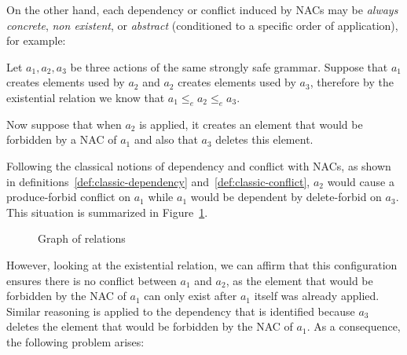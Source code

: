 On the other hand, each dependency or conflict induced by NACs may be \emph{always concrete}, \emph{non existent}, or \emph{abstract} (conditioned to a specific order of application), for example: 

Let $a_1, a_2, a_3$ be three actions of the same strongly safe grammar. Suppose that $a_1$ creates elements used by $a_2$ and $a_2$ creates elements used by $a_3$, therefore by the existential relation we know that $a_1 \leq_e a_2 \leq_e a_3$.

Now suppose that when $a_2$ is applied, it creates an element that would be forbidden by a NAC of $a_1$ and also that $a_3$ deletes this element. 

Following the classical notions of dependency and conflict with NACs, as shown in definitions~\ref{def:classic-dependency} and~\ref{def:classic-conflict}, $a_2$ would cause a produce-forbid conflict on $a_1$ while $a_1$ would be dependent by delete-forbid on $a_3$. This situation is summarized in Figure~\ref{fig:process:order:occurrence-relation-fail}.
\begin{figure}[!ht]
  \centering
  \caption{Graph of relations}\label{fig:process:order:occurrence-relation-fail}
\end{figure}

However, looking at the existential relation, we can affirm that this configuration ensures there is no conflict between $a_1$ and $a_2$, as the element that would be forbidden by the NAC of $a_1$ can only exist after $a_1$ itself was already applied.
Similar reasoning is applied to the dependency that is identified because $a_3$ deletes the element that would be forbidden by the NAC of $a_1$. As a consequence, the following problem arises:

